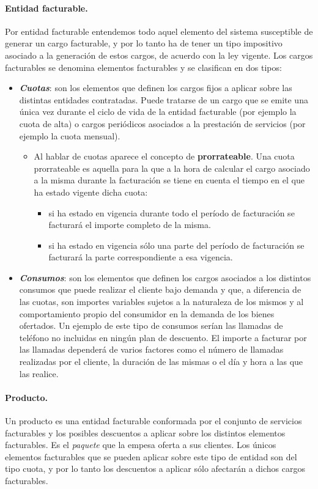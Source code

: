 \paragraph{Entidad facturable.} Por entidad facturable entendemos todo aquel elemento del sistema susceptible de generar un cargo facturable, y por lo tanto ha de tener un tipo impositivo asociado a la generación de estos cargos, de acuerdo con la ley vigente. Los cargos facturables se denomina elementos facturables y se clasifican en dos tipos:
\begin{itemize}
	\item \emph{\textbf{Cuotas}}: son los elementos que definen los cargos fijos a aplicar sobre las distintas entidades contratadas. Puede tratarse de un cargo que se emite una única vez durante el ciclo de vida de la entidad facturable (por ejemplo la cuota de alta) o cargos periódicos asociados a la prestación de servicios (por ejemplo la cuota mensual).
	\begin{itemize}
		\item Al hablar de cuotas aparece el concepto de \textbf{prorrateable}. Una cuota prorrateable es aquella para la que a la hora de calcular el cargo asociado a la misma durante la facturación se tiene en cuenta el tiempo en el que ha estado vigente dicha cuota: 
		\begin{itemize}
			\item si ha estado en vigencia durante todo el período de facturación se 		facturará el importe completo de la misma.
			\item si ha estado en vigencia sólo una parte del período de facturación se facturará la parte correspondiente a esa vigencia. 
		\end{itemize}
	\end{itemize}
	\item \emph{\textbf{Consumos}}: son los elementos que definen los cargos asociados a los distintos consumos que puede realizar el cliente bajo demanda y que, a diferencia de las cuotas, son importes variables sujetos a la naturaleza de los mismos y al comportamiento propio del consumidor en la demanda de los bienes ofertados. Un ejemplo de este tipo de consumos serían las llamadas de teléfono no incluidas en ningún plan de descuento. El importe a facturar por las llamadas dependerá de varios factores como el número de llamadas realizadas por el cliente, la duración de las mismas o el día y hora a las que las realice.
\end{itemize}


\paragraph{Producto.} Un producto es una entidad facturable conformada por el conjunto de servicios facturables y los posibles descuentos a aplicar sobre los distintos elementos facturables. Es el \textit{paquete} que la empesa oferta a sus clientes. Los únicos elementos facturables que se pueden aplicar sobre este tipo de entidad son del tipo cuota, y por lo tanto los descuentos a aplicar sólo afectarán a dichos cargos facturables.


